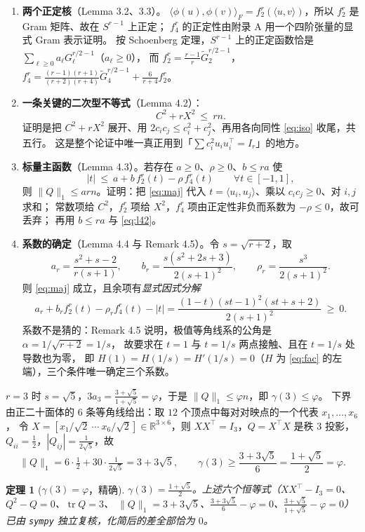 \documentclass[UTF8,11pt]{ctexart}
\newtheorem{theorem}{定理}[section]
\theoremstyle{definition}
\newcommand{\tr}{\operatorname{tr}}
\newcommand{\R}{\mathbb{R}}
\begin{document}
\begin{enumerate}[leftmargin=1.6em,itemsep=3pt]
\item \textbf{两个正定核}（Lemma 3.2、3.3）。
$\langle\phi(u),\phi(v)\rangle_F=f_2^{r}(\langle u,v\rangle)$，所以 $f_2^r$ 是 Gram 矩阵、故在 $S^{r-1}$ 上正定；
$f_4^r$ 的正定性由附录 A 用一个四阶张量的显式 Gram 表示证明。
按 Schoenberg 定理，$S^{r-1}$ 上的正定函数恰是 $\sum_{\ell\ge0}a_\ell G_\ell^{r/2-1}$（$a_\ell\ge0$），
而 $f_2^r=\frac{r-1}{r}\widetilde G_2^{r/2-1}$，
$f_4^r=\frac{(r-1)(r+1)}{(r+2)(r+4)}\widetilde G_4^{r/2-1}+\frac{6}{r+4}f_2^r$。
\item \textbf{一条关键的二次型不等式}（Lemma 4.2）：
\begin{equation}\label{eq:l42}
C^2+rX^2\ \le\ rn .
\end{equation}
证明是把 $C^2+rX^2$ 展开、用 $2c_ic_j\le c_i^2+c_j^2$、再用各向同性 \eqref{eq:iso} 收尾，共五行。
这是整个论证中唯一真正用到「$\sum c_i^2u_iu_i^\top=I_r$」的地方。
\item \textbf{标量主函数}（Lemma 4.3）。若存在 $a\ge0$、$\rho\ge0$、$b\le ra$ 使
\begin{equation}\label{eq:maj}
|t|\ \le\ a+b\,f_2^{r}(t)-\rho\,f_4^{r}(t)\qquad\forall t\in[-1,1],
\end{equation}
则 $\|Q\|_1\le arn$。证明：把 \eqref{eq:maj} 代入 $t=\langle u_i,u_j\rangle$、乘以 $c_ic_j\ge0$、对 $i,j$ 求和；
常数项给 $C^2$，$f_2^r$ 项给 $X^2$，$f_4^r$ 项由正定性非负而系数为 $-\rho\le0$，故可丢弃；
再用 $b\le ra$ 与 \eqref{eq:l42}。
\item \textbf{系数的确定}（Lemma 4.4 与 Remark 4.5）。令 $s=\sqrt{r+2}$，取
\[
a_r=\frac{s^2+s-2}{r(s+1)},\qquad b_r=\frac{s(s^2+2s+3)}{2(s+1)^2},\qquad \rho_r=\frac{s^3}{2(s+1)^2}.
\]
则 \eqref{eq:maj} 成立，且余项有\emph{显式因式分解}
\begin{equation}\label{eq:fac}
a_r+b_rf_2^r(t)-\rho_rf_4^r(t)-|t|=\frac{(1-t)(st-1)^2(st+s+2)}{2(s+1)^2}\ \ge\ 0 .
\end{equation}
系数不是猜的：Remark 4.5 说明，极值等角线系的公角是 $\alpha=1/\sqrt{r+2}=1/s$，
故要求在 $t=1$ 与 $t=1/s$ 两点接触、且在 $t=1/s$ 处导数也为零，
即 $H(1)=H(1/s)=H'(1/s)=0$（$H$ 为 \eqref{eq:fac} 的左端），三个条件唯一确定三个系数。
\end{enumerate}

$r=3$ 时 $s=\sqrt5$，$3a_3=\frac{3+\sqrt5}{1+\sqrt5}=\varphi$，于是 $\|Q\|_1\le\varphi n$，即 $\gamma(3)\le\varphi$。
下界由正二十面体的 $6$ 条等角线给出：取 $12$ 个顶点中每对对映点的一个代表 $x_1,\dots,x_6$，
令 $X=[x_1/\sqrt2\ \cdots\ x_6/\sqrt2]\in\R^{3\times6}$，则 $XX^\top=I_3$，$Q=X^\top X$ 是秩 $3$ 投影，
$Q_{ii}=\frac12$，$|Q_{ij}|=\frac1{2\sqrt5}$，故
\[
\|Q\|_1=6\cdot\tfrac12+30\cdot\tfrac1{2\sqrt5}=3+3\sqrt5,\qquad
\gamma(3)\ge\frac{3+3\sqrt5}{6}=\frac{1+\sqrt5}{2}=\varphi .
\]
\begin{theorem}[$\gamma(3)=\varphi$，精确]\label{thm:gam3}
$\gamma(3)=\frac{1+\sqrt5}{2}$。上述六个恒等式（$XX^\top-I_3=0$、$Q^2-Q=0$、$\tr Q=3$、
$\|Q\|_1=3+3\sqrt5$、$\frac{3+3\sqrt5}{6}-\varphi=0$、$\frac{3+\sqrt5}{1+\sqrt5}-\varphi=0$）
已由 \texttt{sympy} 独立复核，化简后的差全部恰为 $0$。
\end{theorem}
\end{document}
